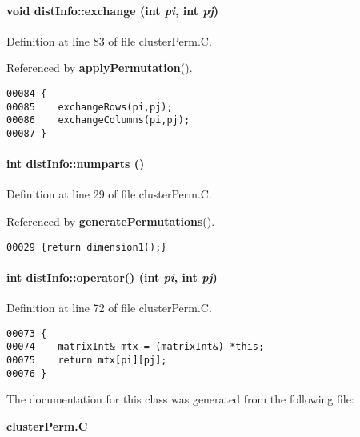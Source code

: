 \paragraph{\setlength{\rightskip}{0pt plus 5cm}void dist\-Info::exchange (int {\em pi}, int {\em pj})}\hfill



Definition at line 83 of file cluster\-Perm.C.

Referenced by {\bf apply\-Permutation}().\small\begin{verbatim}00084 {
00085    exchangeRows(pi,pj);
00086    exchangeColumns(pi,pj);
00087 }
\end{verbatim}\normalsize 
\label{distInfo_a3}
\paragraph{\setlength{\rightskip}{0pt plus 5cm}int dist\-Info::numparts ()\hspace{0.3cm}{\tt  [inline]}}\hfill



Definition at line 29 of file cluster\-Perm.C.

Referenced by {\bf generate\-Permutations}().\small\begin{verbatim}00029 {return dimension1();}
\end{verbatim}\normalsize 
\label{distInfo_a1}
\paragraph{\setlength{\rightskip}{0pt plus 5cm}int dist\-Info::operator() (int {\em pi}, int {\em pj})}\hfill



Definition at line 72 of file cluster\-Perm.C.\small\begin{verbatim}00073 {
00074    matrixInt& mtx = (matrixInt&) *this;
00075    return mtx[pi][pj];
00076 }
\end{verbatim}\normalsize 


The documentation for this class was generated from the following file:\begin{CompactItemize}
\item 
{\bf cluster\-Perm.C}\end{CompactItemize}
